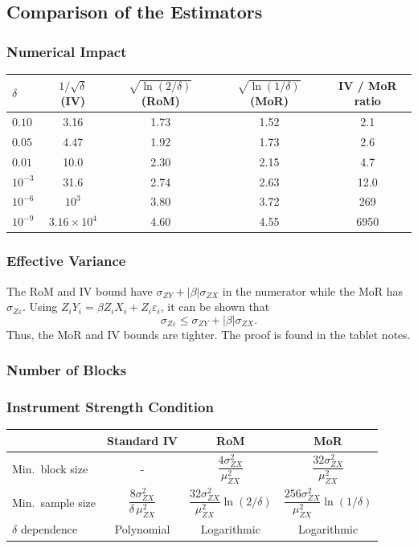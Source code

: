 \subsection{Comparison of the Estimators}


\subsubsection{Numerical Impact}
 
\begin{center}
\renewcommand{\arraystretch}{1.3}
\begin{tabular}{lcccc}
\toprule
$\delta$ & $1/\sqrt{\delta}$ (IV) & $\sqrt{\ln(2/\delta)}$ (RoM) & $\sqrt{\ln(1/\delta)}$ (MoR) & IV / MoR ratio \\
\midrule
$0.10$ & 3.16 & 1.73 & 1.52 & 2.1 \\
$0.05$ & 4.47 & 1.92 & 1.73 & 2.6 \\
$0.01$ & 10.0 & 2.30 & 2.15 & 4.7 \\
$10^{-3}$ & 31.6 & 2.74 & 2.63 & 12.0 \\
$10^{-6}$ & $10^3$ & 3.80 & 3.72 & 269 \\
$10^{-9}$ & $3.16 \times 10^4$ & 4.60 & 4.55 & 6950 \\
\bottomrule
\end{tabular}
\end{center}

\subsubsection{Effective Variance}
The RoM and IV bound have $\sigma_{ZY} + |\beta|\sigma_{ZX}$ in the numerator while the MoR has $\sigma_{Z\varepsilon}$. Using $Z_iY_i = \beta Z_iX_i + Z_i\varepsilon_i$, it can be shown that
\[
    \sigma_{Z\varepsilon} \leq \sigma_{ZY} + |\beta|\sigma_{ZX}.
\]
Thus, the MoR and IV bounds are tighter. The proof is found in the tablet notes.

\subsubsection{Number of Blocks}
\subsubsection{Instrument Strength Condition}
\begin{center}
\renewcommand{\arraystretch}{1.4}
\begin{tabular}{lccc}
\toprule
 & \textbf{Standard IV} & \textbf{RoM} & \textbf{MoR} \\
\midrule
Min.\ block size & - & $\dfrac{4\sigma_{ZX}^2}{\mu_{ZX}^2}$ & $\dfrac{32\sigma_{ZX}^2}{\mu_{ZX}^2}$ \\[12pt]
Min.\ sample size & $\dfrac{8\sigma_{ZX}^2}{\delta\,\mu_{ZX}^2}$ & $\dfrac{32\sigma_{ZX}^2}{\mu_{ZX}^2}\ln(2/\delta)$ & $\dfrac{256\sigma_{ZX}^2}{\mu_{ZX}^2}\ln(1/\delta)$ \\[12pt]
$\delta$ dependence & Polynomial & Logarithmic & Logarithmic \\[4pt]
\bottomrule
\end{tabular}
\end{center}

